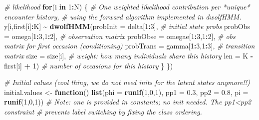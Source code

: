 \documentclass[
  12pt,
]{krantz}
\newenvironment{Shaded}{\begin{snugshade}}{\end{snugshade}}
\newcommand{\AttributeTok}[1]{\textcolor[rgb]{0.13,0.29,0.53}{#1}}
\newcommand{\CommentTok}[1]{\textcolor[rgb]{0.56,0.35,0.01}{\textit{#1}}}
\newcommand{\ControlFlowTok}[1]{\textcolor[rgb]{0.13,0.29,0.53}{\textbf{#1}}}
\newcommand{\DecValTok}[1]{\textcolor[rgb]{0.00,0.00,0.81}{#1}}
\newcommand{\FloatTok}[1]{\textcolor[rgb]{0.00,0.00,0.81}{#1}}
\newcommand{\FunctionTok}[1]{\textcolor[rgb]{0.13,0.29,0.53}{\textbf{#1}}}
\newcommand{\NormalTok}[1]{#1}
\newcommand{\OtherTok}[1]{\textcolor[rgb]{0.56,0.35,0.01}{#1}}
\newcommand{\SpecialCharTok}[1]{\textcolor[rgb]{0.81,0.36,0.00}{\textbf{#1}}}
\begin{document}
\begin{Shaded}
\begin{Highlighting}[]
  \CommentTok{\# likelihood}
  \ControlFlowTok{for}\NormalTok{(i }\ControlFlowTok{in} \DecValTok{1}\SpecialCharTok{:}\NormalTok{N) \{}
    \CommentTok{\# One weighted likelihood contribution per *unique* encounter history,}
    \CommentTok{\# using the forward algorithm implemented in dwolfHMM.}
\NormalTok{    y[i,first[i]}\SpecialCharTok{:}\NormalTok{K] }\SpecialCharTok{\textasciitilde{}} \FunctionTok{dwolfHMM}\NormalTok{(}\AttributeTok{probInit =}\NormalTok{ delta[}\DecValTok{1}\SpecialCharTok{:}\DecValTok{3}\NormalTok{],      }\CommentTok{\# initial state probs}
                               \AttributeTok{probObs =}\NormalTok{ omega[}\DecValTok{1}\SpecialCharTok{:}\DecValTok{3}\NormalTok{,}\DecValTok{1}\SpecialCharTok{:}\DecValTok{2}\NormalTok{],   }\CommentTok{\# observation matrix}
                               \AttributeTok{probObse =}\NormalTok{ omegae[}\DecValTok{1}\SpecialCharTok{:}\DecValTok{3}\NormalTok{,}\DecValTok{1}\SpecialCharTok{:}\DecValTok{2}\NormalTok{], }\CommentTok{\# obs matrix for first occasion (conditioning)}
                               \AttributeTok{probTrans =}\NormalTok{ gamma[}\DecValTok{1}\SpecialCharTok{:}\DecValTok{3}\NormalTok{,}\DecValTok{1}\SpecialCharTok{:}\DecValTok{3}\NormalTok{], }\CommentTok{\# transition matrix}
                               \AttributeTok{size =}\NormalTok{ size[i],             }\CommentTok{\# weight: how many individuals share this history}
                               \AttributeTok{len =}\NormalTok{ K }\SpecialCharTok{{-}}\NormalTok{ first[i] }\SpecialCharTok{+} \DecValTok{1}\NormalTok{)     }\CommentTok{\# number of occasions for this history}
\NormalTok{  \}}
\NormalTok{\})}

\CommentTok{\# Initial values (cool thing, we do not need inits for the latent states anymore!!)}
\NormalTok{initial.values }\OtherTok{\textless{}{-}} \ControlFlowTok{function}\NormalTok{() }\FunctionTok{list}\NormalTok{(}\AttributeTok{phi =} \FunctionTok{runif}\NormalTok{(}\DecValTok{1}\NormalTok{,}\DecValTok{0}\NormalTok{,}\DecValTok{1}\NormalTok{),}
                                  \AttributeTok{pp1 =} \FloatTok{0.3}\NormalTok{,}
                                  \AttributeTok{pp2 =} \FloatTok{0.8}\NormalTok{,}
                                  \AttributeTok{pi =} \FunctionTok{runif}\NormalTok{(}\DecValTok{1}\NormalTok{,}\DecValTok{0}\NormalTok{,}\DecValTok{1}\NormalTok{))}
\CommentTok{\# Note: \textquotesingle{}one\textquotesingle{} is provided in constants; no init needed. The pp1\textless{}pp2 constraint}
\CommentTok{\# prevents label switching by fixing the class ordering.}


\end{Highlighting}
\end{Shaded}
\end{document}
